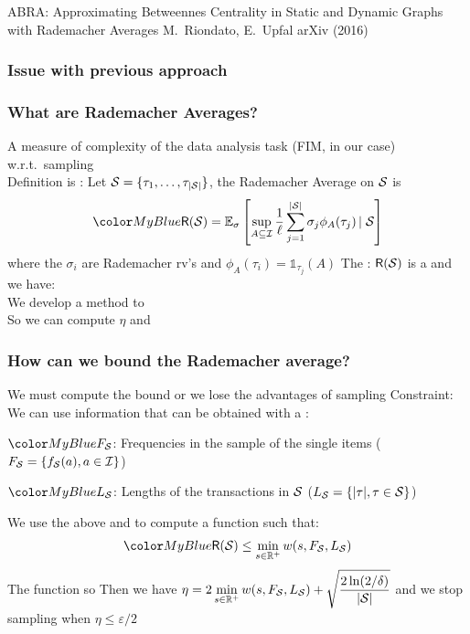 \begin{frame}
  \centering
  \vfill
  {\huge ABRA: Approximating Betweennes Centrality in Static and Dynamic
  Graphs with Rademacher Averages}
  \vfill
  {\large M.~Riondato, E.~Upfal}
  \vfill
  {\large arXiv (2016)}
  \vfill
\end{frame}

\begin{frame}
  \frametitle{Issue with previous approach}
\end{frame}

\begin{frame}
  \frametitle{What are Rademacher Averages?}
  A measure of complexity of the data analysis task (FIM, in our case)
  w.r.t.~sampling\\
  \quad {}
  \vfill
  Definition is : Let ${\cal S}=\{\tau_1,\dotsc,\tau_{|{\cal S}|}\}$, the Rademacher
  Average on ${\cal S}$ is
  \[
    \inblue{\Rade(\Sam)=\expectation_\sigma\left[\sup_{A\subseteq\mathcal{I}}\frac{1}{\ell}\sum_{j=1}^{|\Sam|}
    \sigma_j \phi_A(\tau_j)\left|\right. \Sam\right]}
  \]
  where the $\sigma_i$ are Rademacher rv's and $\phi_A(\tau_i)=\mathds{1}_{\tau_j}(A)$
  \vfill
  The : $\mathsf{R}({\cal S})$ is a  and we have:
  \[
  \]
  We develop a method to \\
  \quad So we can compute $\eta$ and 
\end{frame}

\begin{frame}
  \frametitle{How can we bound the Rademacher average?}
  We must compute the bound  or we lose the advantages of sampling
  \vfill
  Constraint: We can use  information that can be obtained with a
  :\\
  \begin{enumerate*}
    \item $\inblue{F_\Sam}$: Frequencies in the sample of the single items ($F_{\cal S}=\{f_{\cal S}(a),
      a\in\mathcal{I}\}$)
    \item $\inblue{L_\Sam}$: Lengths of the transactions in ${\cal S}$ ($L_{\cal S}=\{|\tau|, \tau\in{\cal S}\}$)
  \end{enumerate*}
  \vfill
  We use the above and  to compute a
  function  such that:
  \[
    \inblue{
    \Rade(\Sam)\le \min_{s\in\mathbb{R}^+} w(s,F_\Sam,L_\Sam)
    }
  \]
  The function  so 
  \vfill
  Then we have $\eta= 2 \displaystyle\min_{s\in\mathbb{R}^+} w(s,F_{\cal S},L_{\cal S}) +
  \displaystyle\sqrt{\frac{2\ln(2/\delta)}{|{\cal S}|}}$ and we stop sampling when
  $\eta\le\varepsilon/2$
\end{frame}

